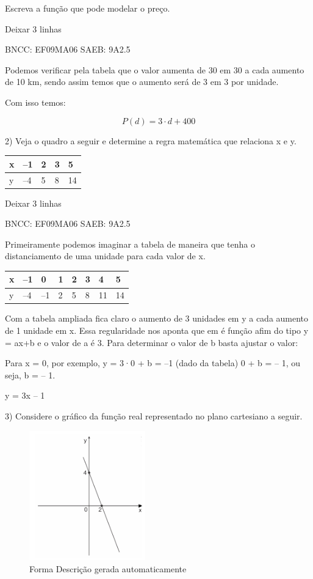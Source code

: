 \begin{escolha}
{{{\begin{escolha}
{Escreva a função que pode modelar o preço.

Deixar 3 linhas

BNCC: EF09MA06 SAEB: 9A2.5

Podemos verificar pela tabela que o valor aumenta de 30 em 30 a cada
aumento de 10 km, sendo assim temos que o aumento será de 3 em 3 por
unidade.

Com isso temos:

\[P\left( d \right) = 3 \cdot d + 400\]

2) Veja o quadro a seguir e determine a regra matemática que relaciona x
e y.

\begin{longtable}[]{@{}lllll@{}}
\toprule\noalign{}
x & --1 & 2 & 3 & 5 \\
\midrule\noalign{}
\endhead
\bottomrule\noalign{}
\endlastfoot
y & --4 & 5 & 8 & 14 \\
\end{longtable}

Deixar 3 linhas

BNCC: EF09MA06 SAEB: 9A2.5

Primeiramente podemos imaginar a tabela de maneira que tenha o
distanciamento de uma unidade para cada valor de x.

\begin{longtable}[]{@{}llllllll@{}}
\toprule\noalign{}
x & --1 & 0 & 1 & 2 & 3 & 4 & 5 \\
\midrule\noalign{}
\endhead
\bottomrule\noalign{}
\endlastfoot
y & --4 & --1 & 2 & 5 & 8 & 11 & 14 \\
\end{longtable}

Com a tabela ampliada fica claro o aumento de 3 unidades em y a cada
aumento de 1 unidade em x. Essa regularidade nos aponta que em é função
afim do tipo y = ax+b e o valor de a é 3. Para determinar o valor de b
basta ajustar o valor:

Para x = 0, por exemplo, y = 3·0 + b = --1 (dado da tabela) 0 + b = --
1, ou seja, b = -- 1.

y = 3x -- 1

3) Considere o gráfico da função real representado no plano cartesiano a
seguir.

\begin{figure}
\centering
\includegraphics[width=1.97543in,height=2.20513in]{./_SAEB_9_MAT/media/image137.png}
\caption{Forma Descrição gerada automaticamente}
\end{figure}

}
\end{escolha}}}}
\end{escolha}
